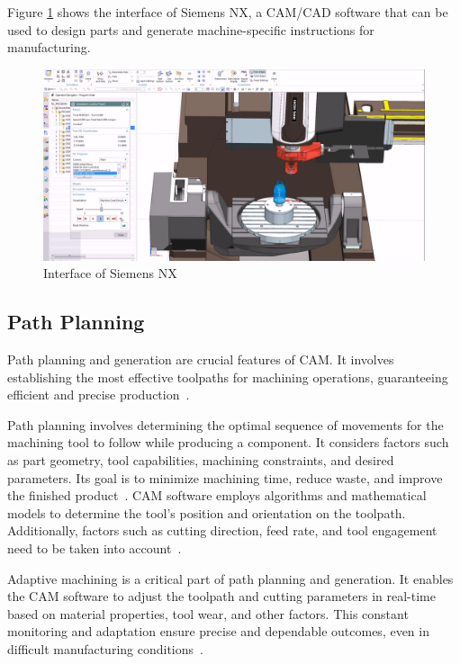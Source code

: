
Figure \ref{CAMinterface} shows the interface of Siemens NX, a CAM/CAD software that can be used to design parts and generate machine-specific instructions for manufacturing. 

\begin{figure}[H]
	\centerline{\includegraphics[scale=.4]{figures/CAM.png}}
	\caption{Interface of Siemens NX~\cite{NXManufacturing.2015}}
	\label{CAMinterface}
\end{figure}


\subsection{Path Planning}\label{papla}
Path planning and generation are crucial features of CAM. It involves establishing the most effective toolpaths for machining operations, guaranteeing efficient and precise production~\cite{Brecher.2013}.

Path planning involves determining the optimal sequence of movements for the machining tool to follow while producing a component. It considers factors such as part geometry, tool capabilities, machining constraints, and desired parameters. Its goal is to minimize machining time, reduce waste, and improve the finished product~\cite{Xu.2015}. CAM software employs algorithms and mathematical models to determine the tool's position and orientation on the toolpath. Additionally, factors such as cutting direction, feed rate, and tool engagement need to be taken into account~\cite{Tunc.2017}.

Adaptive machining is a critical part of path planning and generation. It enables the CAM software to adjust the toolpath and cutting parameters in real-time based on material properties, tool wear, and other factors. This constant monitoring and adaptation ensure precise and dependable outcomes, even in difficult manufacturing conditions~\cite{Liu.2017}.

